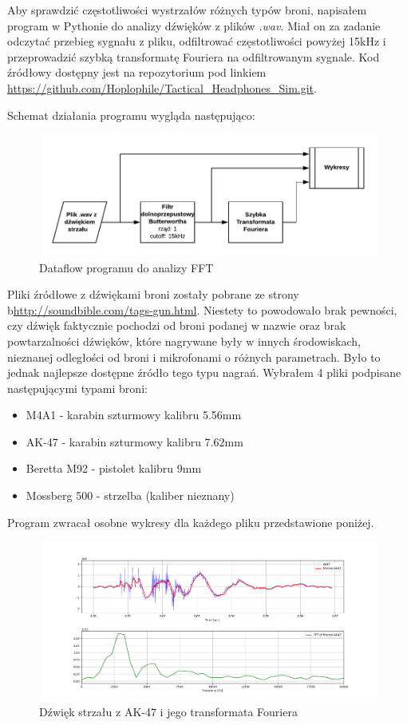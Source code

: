 Aby sprawdzić częstotliwości wystrzałów różnych typów broni, napisałem program w Pythonie do analizy dźwięków z plików \textit{.wav}. Miał on za zadanie odczytać przebieg sygnału z pliku, odfiltrować częstotliwości powyżej 15kHz i przeprowadzić szybką transformatę Fouriera na odfiltrowanym sygnale. Kod źródłowy dostępny jest na repozytorium pod linkiem \url{https://github.com/Hoplophile/Tactical_Headphones_Sim.git}. 

Schemat działania programu wygląda następująco:

\begin{figure}[H]
	\centering
	\includegraphics[scale=1]{grafy/Python_analiza_FFT.pdf}
	\caption{\label{graf:analizaFFT} Dataflow programu do analizy FFT}
\end{figure}

Pliki źródłowe z dźwiękami broni zostały pobrane ze strony b\url{http://soundbible.com/tags-gun.html}. Niestety to powodowało brak pewności, czy dźwięk faktycznie pochodzi od broni podanej w nazwie oraz brak powtarzalności dźwięków, które nagrywane były w innych środowiskach, nieznanej odległości od broni i mikrofonami o różnych parametrach. Było to jednak najlepsze dostępne źródło tego typu nagrań. Wybrałem 4 pliki podpisane następującymi typami broni:

\begin{itemize}
	\item M4A1 - karabin szturmowy kalibru 5.56mm
	\item AK-47 - karabin szturmowy kalibru 7.62mm
	\item Beretta M92 - pistolet kalibru 9mm
	\item Mossberg 500 - strzelba (kaliber nieznany)
\end{itemize}

Program zwracał osobne wykresy dla każdego pliku przedstawione poniżej.

\begin{figure}[H]
	\centering
	\includegraphics[scale=0.35]{wykresy/AK47_fft.png}
	\caption{\label{ak47_fft} Dźwięk strzału z AK-47 i jego transformata Fouriera}
\end{figure}

